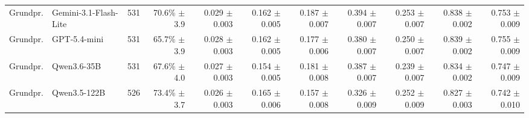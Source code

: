 \begin{table}[t]
{\begin{tabular}{llrrrrrrrrr}
Grundpr. & Gemini-3.1-Flash-Lite & 531 & \shortstack[r]{70.6\%\\{\scriptsize $\pm$3.9}} & \shortstack[r]{0.029\\{\scriptsize $\pm$0.003}} & \shortstack[r]{0.162\\{\scriptsize $\pm$0.005}} & \shortstack[r]{0.187\\{\scriptsize $\pm$0.007}} & \shortstack[r]{0.394\\{\scriptsize $\pm$0.007}} & \shortstack[r]{0.253\\{\scriptsize $\pm$0.007}} & \shortstack[r]{0.838\\{\scriptsize $\pm$0.002}} & \shortstack[r]{0.753\\{\scriptsize $\pm$0.009}} \\
Grundpr. & GPT-5.4-mini & 531 & \shortstack[r]{65.7\%\\{\scriptsize $\pm$3.9}} & \shortstack[r]{0.028\\{\scriptsize $\pm$0.003}} & \shortstack[r]{0.162\\{\scriptsize $\pm$0.005}} & \shortstack[r]{0.177\\{\scriptsize $\pm$0.006}} & \shortstack[r]{0.380\\{\scriptsize $\pm$0.007}} & \shortstack[r]{0.250\\{\scriptsize $\pm$0.007}} & \shortstack[r]{0.839\\{\scriptsize $\pm$0.002}} & \shortstack[r]{0.755\\{\scriptsize $\pm$0.009}} \\
Grundpr. & Qwen3.6-35B & 531 & \shortstack[r]{67.6\%\\{\scriptsize $\pm$4.0}} & \shortstack[r]{0.027\\{\scriptsize $\pm$0.003}} & \shortstack[r]{0.154\\{\scriptsize $\pm$0.005}} & \shortstack[r]{0.181\\{\scriptsize $\pm$0.008}} & \shortstack[r]{0.387\\{\scriptsize $\pm$0.007}} & \shortstack[r]{0.239\\{\scriptsize $\pm$0.007}} & \shortstack[r]{0.834\\{\scriptsize $\pm$0.002}} & \shortstack[r]{0.747\\{\scriptsize $\pm$0.009}} \\
Grundpr. & Qwen3.5-122B & 526 & \shortstack[r]{73.4\%\\{\scriptsize $\pm$3.7}} & \shortstack[r]{0.026\\{\scriptsize $\pm$0.003}} & \shortstack[r]{0.165\\{\scriptsize $\pm$0.006}} & \shortstack[r]{0.157\\{\scriptsize $\pm$0.008}} & \shortstack[r]{0.326\\{\scriptsize $\pm$0.009}} & \shortstack[r]{0.252\\{\scriptsize $\pm$0.009}} & \shortstack[r]{0.827\\{\scriptsize $\pm$0.003}} & \shortstack[r]{0.742\\{\scriptsize $\pm$0.010}} \\

\end{tabular}}
\end{table}
